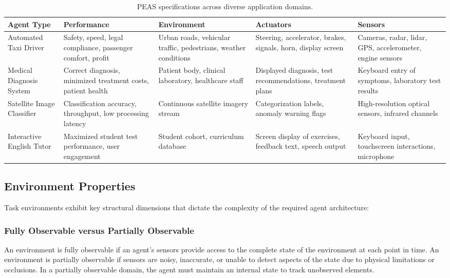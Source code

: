 \documentclass[12pt]{report}
\begin{document}
\begin{table}[htbp]
\centering
\small
\begin{tabularx}{\textwidth}{@{} >{\raggedright\arraybackslash}p{2.2cm} X X X X @{}}
\toprule
\textbf{Agent Type} & \textbf{Performance} & \textbf{Environment} & \textbf{Actuators} & \textbf{Sensors} \\
\midrule
Automated Taxi Driver & Safety, speed, legal compliance, passenger comfort, profit & Urban roads, vehicular traffic, pedestrians, weather conditions & Steering, accelerator, brakes, signals, horn, display screen & Cameras, radar, lidar, GPS, accelerometer, engine sensors \\
Medical Diagnosis System & Correct diagnosis, minimized treatment costs, patient health & Patient body, clinical laboratory, healthcare staff & Displayed diagnosis, test recommendations, treatment plans & Keyboard entry of symptoms, laboratory test results \\
Satellite Image Classifier & Classification accuracy, throughput, low processing latency & Continuous satellite imagery stream & Categorization labels, anomaly warning flags & High-resolution optical sensors, infrared channels \\
Interactive English Tutor & Maximized student test performance, user engagement & Student cohort, curriculum database & Screen display of exercises, feedback text, speech output & Keyboard input, touchscreen interactions, microphone \\
\bottomrule
\end{tabularx}
\caption{PEAS specifications across diverse application domains.}
\label{tab:peas_examples}
\end{table}

\subsection{Environment Properties}

Task environments exhibit key structural dimensions that dictate the complexity of the required agent architecture:

\subsubsection{Fully Observable versus Partially Observable}
An environment is fully observable if an agent's sensors provide access to the complete state of the environment at each point in time. An environment is partially observable if sensors are noisy, inaccurate, or unable to detect aspects of the state due to physical limitations or occlusions. In a partially observable domain, the agent must maintain an internal state to track unobserved elements.
\end{document}
